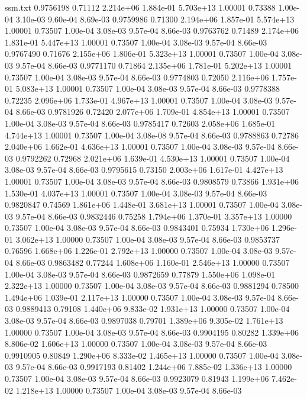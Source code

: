 \begin{filecontents}{ssm.txt}
0.9756198 0.71112 2.214e+06 1.884e-01 5.703e+13 1.00001 0.73388 1.00e-04 3.10e-03 9.60e-04 8.69e-03
0.9759986 0.71300 2.194e+06 1.857e-01 5.574e+13 1.00001 0.73507 1.00e-04 3.08e-03 9.57e-04 8.66e-03
0.9763762 0.71489 2.174e+06 1.831e-01 5.447e+13 1.00001 0.73507 1.00e-04 3.08e-03 9.57e-04 8.66e-03
0.9767490 0.71676 2.155e+06 1.806e-01 5.323e+13 1.00001 0.73507 1.00e-04 3.08e-03 9.57e-04 8.66e-03
0.9771170 0.71864 2.135e+06 1.781e-01 5.202e+13 1.00001 0.73507 1.00e-04 3.08e-03 9.57e-04 8.66e-03
0.9774803 0.72050 2.116e+06 1.757e-01 5.083e+13 1.00001 0.73507 1.00e-04 3.08e-03 9.57e-04 8.66e-03
0.9778388 0.72235 2.096e+06 1.733e-01 4.967e+13 1.00001 0.73507 1.00e-04 3.08e-03 9.57e-04 8.66e-03
0.9781926 0.72420 2.077e+06 1.709e-01 4.854e+13 1.00001 0.73507 1.00e-04 3.08e-03 9.57e-04 8.66e-03
0.9785417 0.72603 2.058e+06 1.685e-01 4.744e+13 1.00001 0.73507 1.00e-04 3.08e-08 9.57e-04 8.66e-03
0.9788863 0.72786 2.040e+06 1.662e-01 4.636e+13 1.00001 0.73507 1.00e-04 3.08e-03 9.57e-04 8.66e-03
0.9792262 0.72968 2.021e+06 1.639e-01 4.530e+13 1.00001 0.73507 1.00e-04 3.08e-03 9.57e-04 8.66e-03
0.9795615 0.73150 2.003e+06 1.617e-01 4.427e+13 1.00001 0.73507 1.00e-04 3.08e-03 9.57e-04 8.66e-03
0.9808579 0.73866 1.931e+06 1.530e-01 4.037e+13 1.00001 0.73507 1.00e-04 3.08e-03 9.57e-04 8.66e-03
0.9820847 0.74569 1.861e+06 1.448e-01 3.681e+13 1.00001 0.73507 1.00e-04 3.08e-03 9.57e-04 8.66e-03
0.9832446 0.75258 1.794e+06 1.370e-01 3.357e+13 1.00000 0.73507 1.00e-04 3.08e-03 9.57e-04 8.66e-03
0.9843401 0.75934 1.730e+06 1.296e-01 3.062e+13 1.00000 0.73507 1.00e-04 3.08e-03 9.57e-04 8.66e-03
0.9853737 0.76596 1.668e+06 1.226e-01 2.792e+13 1.00000 0.73507 1.00e-04 3.08e-03 9.57e-04 8.66e-03
0.9863482 0.77244 1.608e+06 1.160e-01 2.546e+13 1.00000 0.73507 1.00e-04 3.08e-03 9.57e-04 8.66e-03
0.9872659 0.77879 1.550e+06 1.098e-01 2.322e+13 1.00000 0.73507 1.00e-04 3.08e-03 9.57e-04 8.66e-03
0.9881294 0.78500 1.494e+06 1.039e-01 2.117e+13 1.00000 0.73507 1.00e-04 3.08e-03 9.57e-04 8.66e-03
0.9889413 0.79108 1.440e+06 9.833e-02 1.931e+13 1.00000 0.73507 1.00e-04 3.08e-03 9.57e-04 8.66e-03
0.9897038 0.79701 1.389e+06 9.305e-02 1.761e+13 1.00000 0.73507 1.00e-04 3.08e-03 9.57e-04 8.66e-03
0.9904195 0.80282 1.339e+06 8.806e-02 1.606e+13 1.00000 0.73507 1.00e-04 3.08e-03 9.57e-04 8.66e-03
0.9910905 0.80849 1.290e+06 8.333e-02 1.465e+13 1.00000 0.73507 1.00e-04 3.08e-03 9.57e-04 8.66e-03
0.9917193 0.81402 1.244e+06 7.885e-02 1.336e+13 1.00000 0.73507 1.00e-04 3.08e-03 9.57e-04 8.66e-03
0.9923079 0.81943 1.199e+06 7.462e-02 1.218e+13 1.00000 0.73507 1.00e-04 3.08e-03 9.57e-04 8.66e-03

\end{filecontents}
